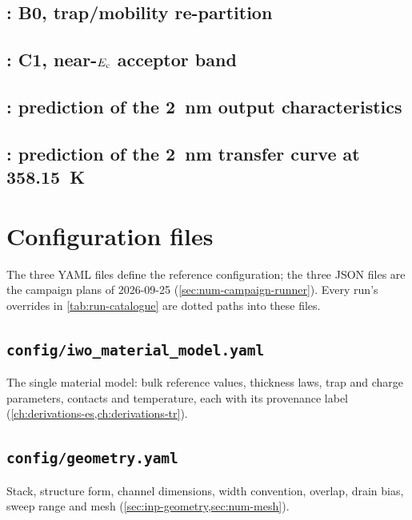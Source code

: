 \subsection{: B0, trap/mobility re-partition}


\subsection{: C1, near-$E_{\mathrm{c}}$ acceptor band}


\subsection{: prediction of the \SI{2}{nm} output characteristics}


\subsection{: prediction of the \SI{2}{nm} transfer curve at \SI{358.15}{K}}


\section{Configuration files}\label{sec:decks-config}

The three YAML files define the reference configuration; the three JSON files are the campaign plans of 2026-09-25
(\cref{sec:num-campaign-runner}). Every run's overrides in \cref{tab:run-catalogue} are dotted paths into these files.

\subsection{\texttt{config/iwo\_material\_model.yaml}}
The single material model: bulk reference values, thickness laws, trap and charge parameters, contacts and temperature,
each with its provenance label (\cref{ch:derivations-es,ch:derivations-tr}).


\subsection{\texttt{config/geometry.yaml}}
Stack, structure form, channel dimensions, width convention, overlap, drain bias, sweep range and mesh
(\cref{sec:inp-geometry,sec:num-mesh}).


